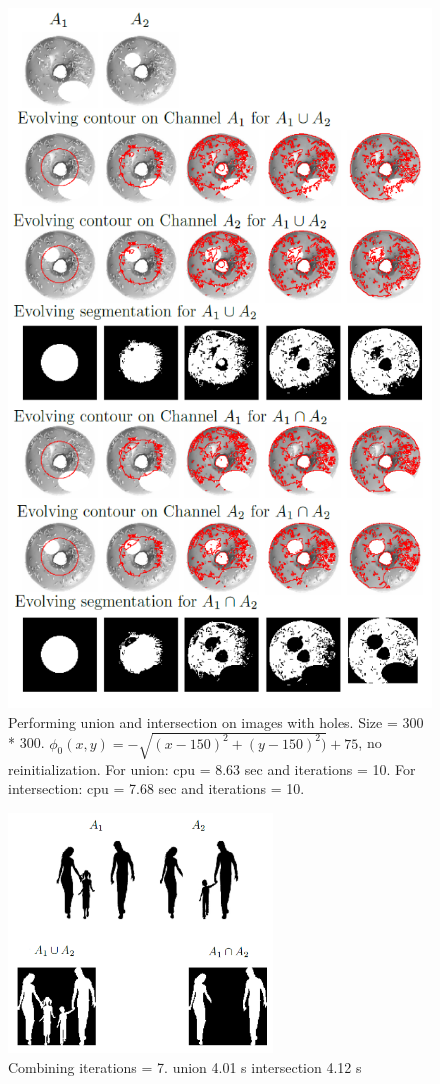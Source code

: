 \documentclass[10pt,twocolumn,letterpaper]{article}
\begin{document}
\begin{figure}[t]
\centering
\includegraphics[width=12cm]{donutlogic.png}
\caption{Performing union and intersection on images with holes. Size = 300 * 300. $\phi_{0}(x,y) = - \sqrt{(x - 150)^2 + (y - 150)^2)} +
75$, no reinitialization. For union: cpu = 8.63 sec and iterations = 10. For intersection: cpu = 7.68 sec and iterations = 10.}
\label{fig:donutlogic}
\end{figure}

\begin{figure}[t]
\centering
\includegraphics[width=7cm]{family.png}
\caption{Combining iterations = 7. union 4.01 s intersection 4.12 s}
\label{fig:donutlogic}
\end{figure}
\end{document}
